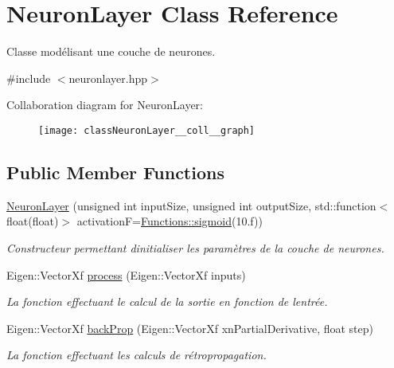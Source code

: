 \hypertarget{classNeuronLayer}{}\section{Neuron\+Layer Class Reference}
\label{classNeuronLayer}


Classe modélisant une couche de neurones.  




{\ttfamily \#include $<$neuronlayer.\+hpp$>$}



Collaboration diagram for Neuron\+Layer\+:
\nopagebreak
\begin{figure}[H]
\begin{center}
\leavevmode
\texttt{[image: classNeuronLayer\_\_coll\_\_graph]}
\end{center}
\end{figure}
\subsection*{Public Member Functions}
\begin{DoxyCompactItemize}
\item 
\hyperlink{classNeuronLayer_afe2804871685b8103d7cd461460e7b31}{Neuron\+Layer} (unsigned int input\+Size, unsigned int output\+Size, std\+::function$<$ float(float)$>$ activationF=\hyperlink{structFunctions_a773de9cd59f7ccc3e2fe9822f0536ae4}{Functions\+::sigmoid}(10.f))
\begin{DoxyCompactList}\small\item\em Constructeur permettant d\textquotesingle{}initialiser les paramètres de la couche de neurones. \end{DoxyCompactList}\item 
Eigen\+::\+Vector\+Xf \hyperlink{classNeuronLayer_aa374ba7d040ae618b5037aa88e5efae7}{process} (Eigen\+::\+Vector\+Xf inputs)
\begin{DoxyCompactList}\small\item\em La fonction effectuant le calcul de la sortie en fonction de l\textquotesingle{}entrée. \end{DoxyCompactList}\item 
Eigen\+::\+Vector\+Xf \hyperlink{classNeuronLayer_a0896580aa265681f77efbcb81c6c8150}{back\+Prop} (Eigen\+::\+Vector\+Xf xn\+Partial\+Derivative, float step)
\begin{DoxyCompactList}\small\item\em La fonction effectuant les calculs de rétropropagation. \end{DoxyCompactList}\end{DoxyCompactItemize}

